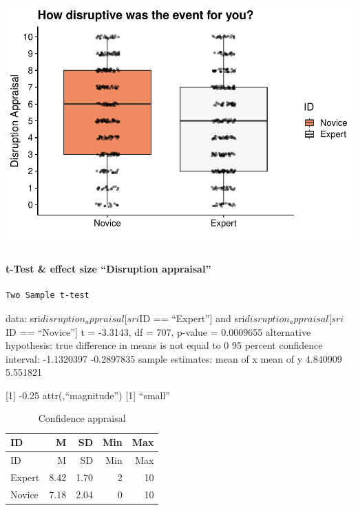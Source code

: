 \documentclass[
]{article}
\begin{document}
\includegraphics{expertise_2024_09_26_no_outlierdetection_MK_files/figure-latex/rating_scales-1.pdf}

\paragraph{t-Test \& effect size ``Disruption
appraisal''}\label{t-test-effect-size-disruption-appraisal}

\begin{verbatim}
Two Sample t-test
\end{verbatim}

data: sri\(disruption_appraisal[sri\)ID == ``Expert''{]} and
sri\(disruption_appraisal[sri\)ID == ``Novice''{]} t = -3.3143, df =
707, p-value = 0.0009655 alternative hypothesis: true difference in
means is not equal to 0 95 percent confidence interval: -1.1320397
-0.2897835 sample estimates: mean of x mean of y 4.840909 5.551821

{[}1{]} -0.25 attr(,``magnitude'') {[}1{]} ``small''

\begin{longtable}[]{@{}lrrrr@{}}
\caption{Confidence appraisal}\tabularnewline
\toprule\noalign{}
ID & M & SD & Min & Max \\
\midrule\noalign{}
\endfirsthead
\toprule\noalign{}
ID & M & SD & Min & Max \\
\midrule\noalign{}
\endhead
\bottomrule\noalign{}
\endlastfoot
Expert & 8.42 & 1.70 & 2 & 10 \\
Novice & 7.18 & 2.04 & 0 & 10 \\
\end{longtable}
\end{document}
